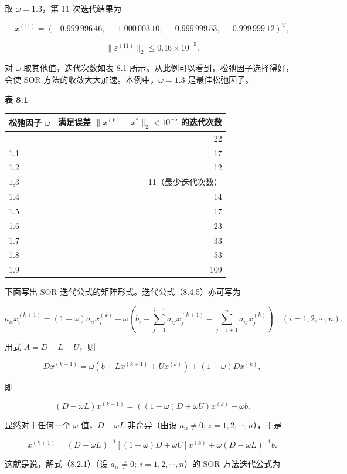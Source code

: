 \documentclass[
  10pt,
  fontset=fandol]{ctexart}
\newcounter{none} %
\begin{document}
取 \(\omega=1.3\)，第 11 次迭代结果为

\[
x^{(11)}=(-0.999\,996\,46,\ -1.000\,003\,10,\ -0.999\,999\,53,\ -0.999\,999\,12)^{\mathrm T},
\]

\[
\|\varepsilon^{(11)}\|_2\leqslant0.46\times10^{-5}.
\]

对 \(\omega\) 取其他值，迭代次数如表 8.1 所示。从此例可以看到，松弛因子选择得好，会使 SOR 方法的收敛大大加速。本例中，\(\omega=1.3\) 是最佳松弛因子。


\textbf{表 8.1}

{\def\LTcaptype{none} %
\begin{longtable}[]{@{}lr@{}}
\toprule\noalign{}
松弛因子 \(\omega\) & 满足误差 \(\|x^{(k)}-x^*\|_2<10^{-5}\) 的迭代次数 \\
\midrule\noalign{}
\endhead
\bottomrule\noalign{}
\endlastfoot
1.0 & 22 \\
1.1 & 17 \\
1.2 & 12 \\
\(\underline{1.3}\) & 11（最少迭代次数） \\
1.4 & 14 \\
1.5 & 17 \\
1.6 & 23 \\
1.7 & 33 \\
1.8 & 53 \\
1.9 & 109 \\
\end{longtable}
}

下面写出 SOR 迭代公式的矩阵形式。迭代公式（8.4.5）亦可写为

\[
a_{ii}x_i^{(k+1)}=(1-\omega)a_{ii}x_i^{(k)}+\omega\left(b_i-\sum_{j=1}^{i-1}a_{ij}x_j^{(k+1)}-\sum_{j=i+1}^n a_{ij}x_j^{(k)}\right)\quad(i=1,2,\cdots,n).
\tag{8.4.7}
\]

用式 \(A=D-L-U\)，则

\[
Dx^{(k+1)}=\omega(b+Lx^{(k+1)}+Ux^{(k)})+(1-\omega)Dx^{(k)},
\]

即

\[
(D-\omega L)x^{(k+1)}=((1-\omega)D+\omega U)x^{(k)}+\omega b.
\]

显然对于任何一个 \(\omega\) 值，\(D-\omega L\) 非奇异（由设 \(a_{ii}\neq0;\ i=1,2,\cdots,n\)），于是

\[
x^{(k+1)}=(D-\omega L)^{-1}[(1-\omega)D+\omega U]x^{(k)}+\omega(D-\omega L)^{-1}b.
\]

这就是说，解式（8.2.1）（设 \(a_{ii}\neq0;\ i=1,2,\cdots,n\)）的 SOR 方法迭代公式为
\end{document}
